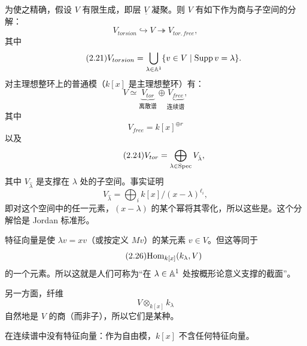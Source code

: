 为使之精确，假设 $V$ 有限生成，即层 $\underline{V}$ 凝聚。则 $V$ 有如下作为商与子空间的分解：
\begin{equation}\tag{2.20}
V_{torsion}\hookrightarrow V\twoheadrightarrow V_{tor.\,free},
\end{equation}
其中
\begin{equation}\tag{2.21}
V_{torsion}=\bigcup_{\lambda\in\mathbb{A}^1}\{v\in V\mid \operatorname{Supp}v=\lambda\}.
\end{equation}
对主理想整环上的普通模（$k[x]$ 是主理想整环）有：
\begin{equation}\tag{2.22}
V\simeq \underbrace{V_{tor}}_{\text{离散谱}}\oplus\underbrace{V_{free}}_{\text{连续谱}},
\end{equation}
其中
\begin{equation}\tag{2.23}
V_{free}=k[x]^{\oplus r}
\end{equation}
以及
\begin{equation}\tag{2.24}
V_{tor}=\bigoplus_{\lambda\in\mathrm{Spec}}V_{\hat\lambda},
\end{equation}
其中 $V_{\hat\lambda}$ 是支撑在 $\lambda$ 处的子空间。事实证明
\begin{equation}\tag{2.25}
V_{\hat\lambda}=\bigoplus_i k[x]/(x-\lambda)^{\ell_i},
\end{equation}
即对这个空间中的任一元素，$(x-\lambda)$ 的某个幂将其零化，所以这些是。这个分解恰是 Jordan 标准形。

特征向量是使 $\lambda v=xv$（或按定义 $Mv$）的某元素 $v\in V$。但这等同于
\begin{equation}\tag{2.26}
\mathrm{Hom}_{k[x]}(k_\lambda,V)
\end{equation}
的一个元素。所以这就是人们可称为“在 $\lambda\in\mathbb{A}^1$ 处按概形论意义支撑的截面”。

另一方面，纤维
\begin{equation}\tag{2.27}
V\otimes_{k[x]}k_\lambda
\end{equation}
自然地是 $V$ 的商（而非子），所以它们是某种。

在连续谱中没有特征向量：作为自由模，$k[x]$ 不含任何特征向量。

